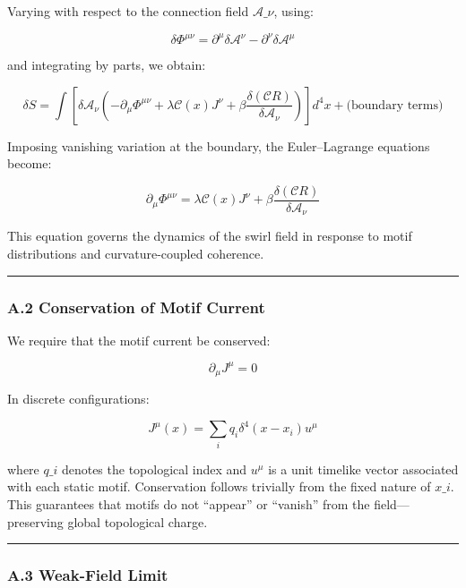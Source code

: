 \documentclass[
  11pt,
]{article}
\begin{document}
Varying with respect to the connection field \(\mathcal{A}\_\nu\),
using:

\[
\delta \Phi^{\mu\nu} = \partial^\mu \delta \mathcal{A}^\nu - \partial^\nu \delta \mathcal{A}^\mu
\]

and integrating by parts, we obtain:

\[
\delta S = \int \left[ \delta \mathcal{A}_\nu \left( -\partial_\mu \Phi^{\mu\nu} + \lambda \mathcal{C}(x) J^\nu + \beta \frac{\delta(\mathcal{C} R)}{\delta \mathcal{A}_\nu} \right) \right] d^4x + \text{(boundary terms)}
\]

Imposing vanishing variation at the boundary, the Euler--Lagrange
equations become:

\[
\partial_\mu \Phi^{\mu\nu} = \lambda \mathcal{C}(x) J^\nu + \beta \frac{\delta(\mathcal{C} R)}{\delta \mathcal{A}_\nu}
\]

This equation governs the dynamics of the swirl field in response to
motif distributions and curvature-coupled coherence.

\begin{center}\rule{0.5\linewidth}{0.5pt}\end{center}

\subsubsection{A.2 Conservation of Motif
Current}\label{a.2-conservation-of-motif-current}

We require that the motif current be conserved:

\[
\partial_\mu J^\mu = 0
\]

In discrete configurations:

\[
J^\mu(x) = \sum_i q_i \delta^4(x - x_i) u^\mu
\]

where \(q\_i\) denotes the topological index and \(u^\mu\) is a unit
timelike vector associated with each static motif. Conservation follows
trivially from the fixed nature of \(x\_i\). This guarantees that motifs
do not ``appear'' or ``vanish'' from the field---preserving global
topological charge.

\begin{center}\rule{0.5\linewidth}{0.5pt}\end{center}

\subsubsection{A.3 Weak-Field Limit}\label{a.3-weak-field-limit}
\end{document}
